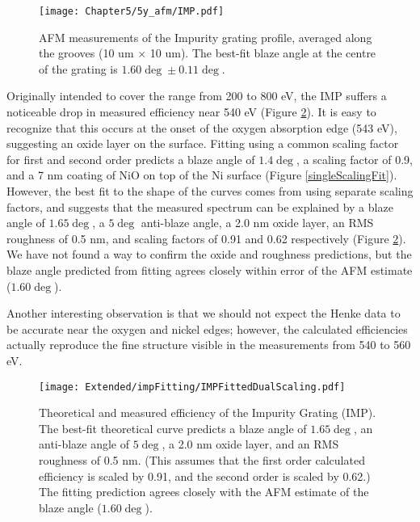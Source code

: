 \begin{figure}[htbp] %
   \centering
   \texttt{[image: Chapter5/5y\_afm/IMP.pdf]} 
   \caption{AFM measurements of the Impurity grating profile, averaged along the grooves (10 um $\times$ 10 um).  The best-fit blaze angle at the centre of the grating is $1.60\deg \pm 0.11\deg$.}
   \label{5y-imp}
\end{figure}

Originally intended to cover the range from 200 to 800 eV, the IMP suffers a noticeable drop in measured efficiency near 540 eV (Figure \ref{5x-imp}).  It is easy to recognize that this occurs at the onset of the oxygen absorption edge (543 eV), suggesting an oxide layer on the surface.  Fitting using a common scaling factor for first and second order predicts a blaze angle of $1.4\deg$, a scaling factor of 0.9, and a 7 nm coating of NiO on top of the Ni surface (Figure \ref{singleScalingFit}).  However, the best fit to the shape of the curves comes from using separate scaling factors, and suggests that the measured spectrum can be explained by a blaze angle of $1.65\deg$, a $5\deg$ anti-blaze angle, a 2.0 nm oxide layer, an RMS roughness of 0.5 nm, and scaling factors of 0.91 and 0.62 respectively (Figure \ref{5x-imp}).  We have not found a way to confirm the oxide and roughness predictions, but the blaze angle predicted from fitting agrees closely within error of the AFM estimate ($1.60\deg$).

Another interesting observation is that we should not expect the Henke data to be accurate near the oxygen and nickel edges; however, the calculated efficiencies actually reproduce the fine structure visible in the measurements from 540 to 560 eV.

\begin{figure}[htbp] %
   \centering
   \texttt{[image: Extended/impFitting/IMPFittedDualScaling.pdf]} 
   \caption{Theoretical and measured efficiency of the Impurity Grating (IMP).  The best-fit theoretical curve predicts a blaze angle of $1.65\deg$, an anti-blaze angle of $5\deg$, a 2.0 nm oxide layer, and an RMS roughness of 0.5 nm.  (This assumes that the first order calculated efficiency is scaled by 0.91, and the second order is scaled by 0.62.)  The fitting prediction agrees closely with the AFM estimate of the blaze angle ($1.60\deg$).}
   \label{5x-imp}
\end{figure}

